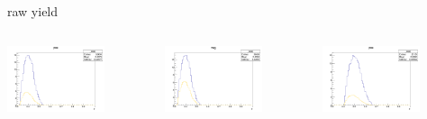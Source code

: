 \begin{frame}{raw yield}
\begin{columns}
\begin{column}[T]{0.25\textwidth}
\includegraphics[width = 0.7\textwidth]{results/yield/statistics/yield_x_Q2_z_0.55_4.764_0.40_pos.png}
\end{column}
\begin{column}[T]{0.25\textwidth}
\includegraphics[width = 0.7\textwidth]{results/yield/statistics/yield_x_Q2_z_0.55_4.764_0.40_neg.png}
\end{column}
\begin{column}[T]{0.25\textwidth}
\includegraphics[width = 0.7\textwidth]{results/yield/statistics/yield_x_Q2_z_0.55_4.764_0.50_pos.png}

\end{column}
\end{columns}
\end{frame}
